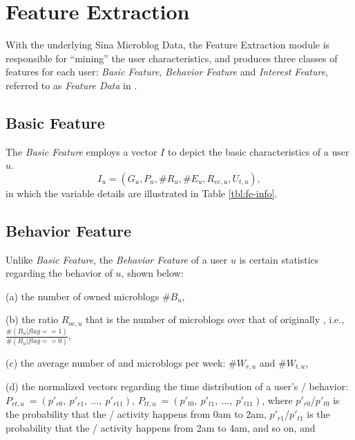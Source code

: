 \section{Feature Extraction}
\label{sec:fe}

With the underlying Sina Microblog Data, the Feature Extraction module is responsible for ``mining'' the user characteristics, and produces three classes of features for each user: \textit{Basic Feature}, \textit{Behavior Feature} and \textit{Interest Feature}, referred to as  \textit{Feature Data} in \sys{}.




\subsection{Basic Feature}

The \textit{Basic Feature} employs a vector $I$ to depict the basic characteristics of a user $u$.
\begin{equation}
\label{eq:info}
	I_u = (G_u, P_u, \#R_u, \#E_u, R_{ee,u}, U_{t,u}),
\end{equation}
in which the variable details are illustrated in Table \ref{tbl:fe-info}.

\subsection{Behavior Feature}

Unlike \textit{Basic Feature}, the \textit{Behavior Feature} of a user $u$ is certain statistics regarding the \retg{} behavior of $u$, shown below:

\sstab(a) the number of owned microblogs $\#B_u$,

\sstab(b) the ratio $R_{oc,u}$ that is the number of \retd{} microblogs over that of originally \twd{}, i.e., $\frac{\#(B_u | flag ==1)}{\#(B_u | flag ==0)}$,

\sstab(c) the average number of \retd{} and \twd{} microblogs per week: $\#W_{r,u}$ and $\#W_{t,u}$,

\sstab(d) the normalized vectors regarding the time distribution of a user's \retg{}/\twg{} behavior: $P_{rt,u}\ = (p'_{r0},\ p'_{r1},\ ...,\ p'_{r11})$, $P_{tt,u}\ = (p'_{t0},\ p'_{t1},\ ...,\ p'_{t11})$, where $p'_{r0}$/$p'_{t0}$ is the probability that the \retg{}/\twg{} activity happens from 0am to 2am, $p'_{r1}$/$p'_{t1}$ is the probability that the \retg{}/\twg{} activity happens from 2am to 4am, and so on, and

